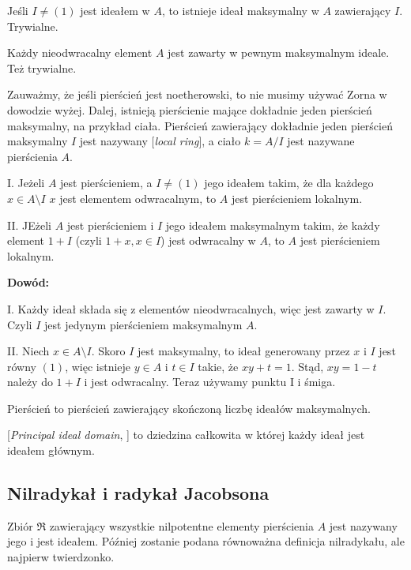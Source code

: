 \proofend

Jeśli $I\neq(1)$ jest ideałem w $A$, to istnieje ideał maksymalny w $A$ zawierający $I$. Trywialne.

Każdy nieodwracalny element $A$ jest zawarty w pewnym maksymalnym ideale. Też trywialne.
\smallskip

Zauważmy, że jeśli pierścień jest noetherowski, to nie musimy używać Zorna w dowodzie wyżej. Dalej, istnieją pierścienie mające dokładnie jeden pierścień maksymalny, na przykład ciała. Pierścień zawierający dokładnie jeden pierścień maksymalny $I$ jest nazywany  [\emph{local ring}], a ciało $k=A/I$ jest nazywane  pierścienia $A$.


\indent I. Jeżeli $A$ jest pierścieniem, a $I\neq(1)$ jego ideałem takim, że dla każdego $x\in A\setminus I$ $x$ jest elementem odwracalnym, to $A$ jest pierścieniem lokalnym.

\indent II. JEżeli $A$ jest pierścieniem i $I$ jego ideałem maksymalnym takim, że każdy element $1+I$ (czyli $1+x,x\in I$) jest odwracalny w $A$, to $A$ jest pierścieniem lokalnym.

\textbf{Dowód:}

I. Każdy ideał składa się z elementów nieodwracalnych,  więc jest zawarty w $I$. Czyli $I$ jest jedynym pierścieniem maksymalnym $A$.

II. Niech $x\in A\setminus I$. Skoro $I$ jest maksymalny, to ideał generowany przez $x$ i $I$ jest równy $(1)$, więc istnieje $y\in A$ i $t\in I$ takie, że $xy+t=1$. Stąd, $xy=1-t$ należy do $1+I$ i jest odwracalny. Teraz używamy punktu I i śmiga.

\proofend

Pierścień  to pierścień zawierający skończoną liczbę ideałów maksymalnych.

 [\emph{Principal ideal domain}, ] to dziedzina całkowita w której każdy ideał jest ideałem głównym.

\subsection{Nilradykał i radykał Jacobsona}

Zbiór $\mathfrak{R}$ zawierający wszystkie nilpotentne elementy pierścienia $A$ jest nazywany jego  i jest ideałem. Później zostanie podana równoważna definicja nilradykału, ale najpierw twierdzonko.

